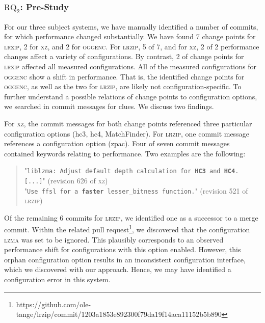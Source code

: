 \documentclass[sigconf]{acmart}
\begin{document}
	\subsubsection{$\text{RQ}_2$: Pre-Study}
	For our three subject systems, we have manually identified a number of commits, for which performance changed substantially. We have found 7 change points for \textsc{lrzip}, 2 for \textsc{xz}, and 2 for \textsc{oggenc}. For \textsc{lrzip}, 5 of 7, and for \textsc{xz}, 2 of 2 performance changes affect a variety of configurations. By contrast, 2 of change points for \textsc{lrzip} affected all measured configurations. All of the measured configurations for \textsc{oggenc} show a shift in performance. That is, the identified change points for \textsc{oggenc}, as well as the two for \textsc{lrzip}, are likely not configuration-specific. 	
	To further understand a possible relations of change points to configuration options, we searched in commit messages for clues. We discuss two findings. 
	
	For \textsc{xz}, the commit messages for both change points referenced three particular configuration options (\textsf{hc3}, \textsf{hc4}, \textsf{MatchFinder}). For \textsc{lrzip}, one commit message references a configuration option (\textsf{zpac}). Four of seven commit messages contained keywords relating to performance. Two examples are the following:
	
	\begin{quotation}
		"\texttt{\footnotesize liblzma: Adjust default depth calculation for \textbf{HC3} and \textbf{HC4}. [...]}" (revision 626 of \textsc{xz})\\
		"\texttt{\footnotesize Use ffsl for a \textbf{faster} lesser\_bitness function.}" (revision 521 of \textsc{lrzip})
	\end{quotation}
	
	Of the remaining 6 commits for \textsc{lrzip}, we identified one as a successor to a merge commit. Within the related pull request\footnote{https://github.com/ole-tange/lrzip/commit/1203a1853e892300f79da19f14aca11152b5b890}, we discovered that the configuration \textsc{lzma} was set to be ignored. This plausibly corresponds to an observed performance shift for configurations with this option enabled. However, this orphan configuration option results in an inconsistent configuration interface, which we discovered with our approach. Hence, we may have identified a configuration error in this system.
\end{document}
